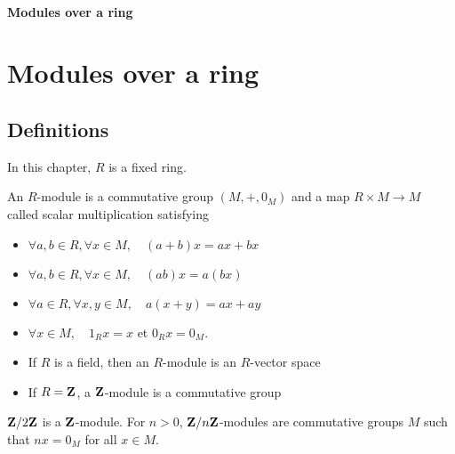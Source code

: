 \ifsolo
    ~

    \vspace{1cm}

    \begin{center}
        \textbf{\LARGE Modules over a ring} \\[1em]
    \end{center}

    \vspace{1cm}

    \tableofcontents

    \vspace{1cm}

\else
    \chapter{Modules over a ring}

    \minitoc
\fi
\thispagestyle{empty}


\section{Definitions}

In this chapter, $R$ is a fixed ring.

\begin{dfn}
    An $R$-module is a commutative group $(M, +, 0_M)$ and a map $R\times M \longrightarrow M$ called scalar multiplication satisfying
    \begin{itemize}
        \item $\forall a,b\in R, \forall x\in M, \quad (a+b)x=ax+bx$
        \item $\forall a,b\in R, \forall x\in M, \quad (ab)x=a(bx)$
        \item $\forall a\in R, \forall x, y\in M, \quad a(x+y)=ax+ay$
        \item $\forall x\in M, \quad 1_Rx=x$ et $0_Rx=0_M$.
    \end{itemize}
\end{dfn}

\begin{ex}
    \begin{itemize}
        \item If $R$ is a field, then an $R$-module is an $R$-vector space
        \item If $R=\mathbf Z$, a $\mathbf Z$-module is a commutative group 
    \end{itemize}
\end{ex}

\begin{exo}
$\mathbf Z/2\mathbf Z$ is a $\mathbf Z$-module. For $n>0$, $\mathbf Z/n\mathbf Z$-modules are commutative groups $M$ such that $nx=0_M$ for all $x\in M$.    
\end{exo}

